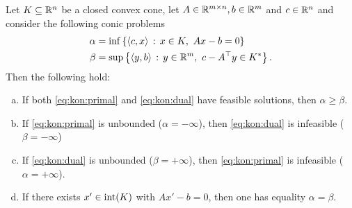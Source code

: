 \begin{theorem}
	\label{thm:kon:dualitaet}
	Let $K \subseteq \mathbb{R}^n$ be a closed convex cone, let $A \in \mathbb{R}^{m \times n}, b \in \mathbb{R}^m$ and $c \in \mathbb{R}^n$ and consider the following conic problems
	\begin{align}
		\alpha & = \inf \left\{ \left\langle c , x \right\rangle \,:\, x \in K, \ Ax -b = 0  \right\} \label{eq:kon:primal}
		\\ \beta & = \sup \left\{ \left\langle y , b \right\rangle \,:\, y  \in \mathbb{R}^m, \  c - A^\top y \in K^\ast \right\}. \label{eq:kon:dual}
	\end{align}
	Then the following hold:
	\begin{enumerate}[(a)]
		\item If both \eqref{eq:kon:primal} and \eqref{eq:kon:dual} have feasible solutions, then $\alpha \ge \beta$. 
		\item If \eqref{eq:kon:primal} is unbounded ($\alpha= -\infty$), then \eqref{eq:kon:dual} is infeasible ($\beta = -\infty$)
		\item If \eqref{eq:kon:dual} is unbounded ($\beta=+\infty$), then \eqref{eq:kon:primal} is infeasible ($\alpha = +\infty$). 
		\item If there exists $x' \in \operatorname{int}(K)$ with $A x' - b = 0$, then one has equality $\alpha = \beta$.
	\end{enumerate}
\end{theorem}

